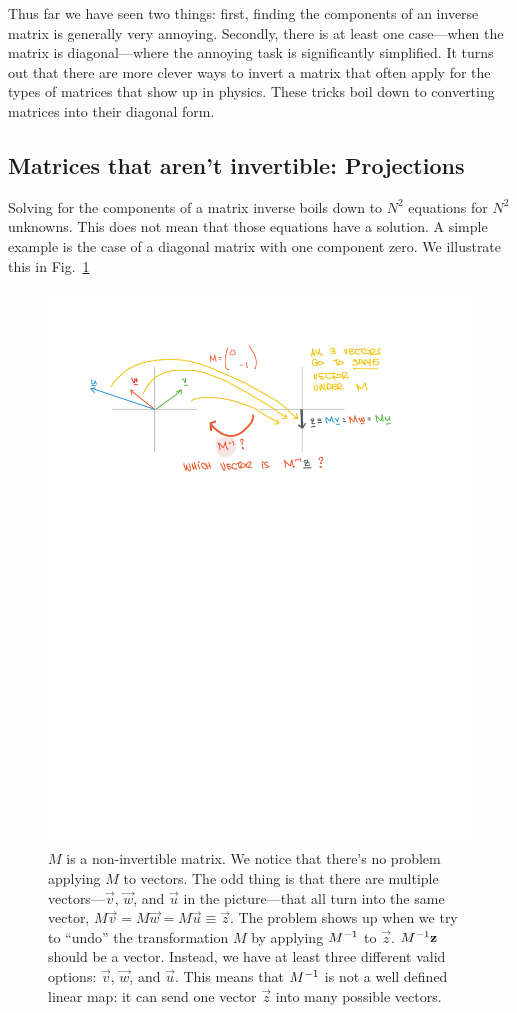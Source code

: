 \documentclass[12pt]{article}
\begin{document}
Thus far we have seen two things: first, finding the components of an inverse matrix is generally very annoying. Secondly, there is at least one case---when the matrix is diagonal---where the annoying task is significantly simplified. It turns out that there are more clever ways to invert a matrix that often apply for the types of matrices that show up in physics. These tricks boil down to converting matrices into their diagonal form.



\subsection{Matrices that aren't invertible: Projections}

Solving for the components of a matrix inverse boils down to $N^2$ equations for $N^2$ unknowns. This does not mean that those equations have a solution. A simple example is the case of a diagonal matrix with one component zero. We illustrate this in Fig.~\ref{fig:map:M:no:inv}
\begin{figure}[tb]
    \centering
    \includegraphics[width=.8\textwidth]{figures/maps_noninv.pdf}
    \caption{$M$ is a non-invertible matrix. We notice that there's no problem applying $M$ to vectors. The odd thing is that there are multiple vectors---$\vec{v}$, $\vec{w}$, and $\vec{u}$ in the picture---that all turn into the same vector, $M\vec{v} = M\vec{w}=M\vec{u}\equiv \vec{z}$. The problem shows up when we try to ``undo'' the transformation $M$ by applying $M^{-1}$ to $\vec{z}$. $M^{-1}\mathbf{z}$ should be a vector. Instead, we have at least three different valid options: $\vec{v}$, $\vec{w}$, and $\vec{u}$. This means that $M^{-1}$ is not a well defined linear map: it can send one vector $\vec{z}$ into many possible vectors. }
    \label{fig:map:M:no:inv}
\end{figure}
\end{document}
